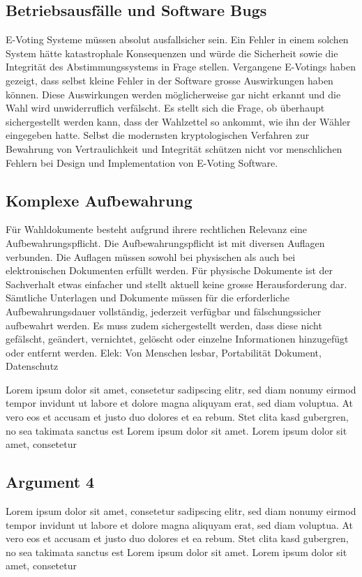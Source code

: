 \documentclass[10pt,a4paper]{article} %
\begin{document}
\begin{multicols}{2}
\subsection*{Betriebsausfälle und Software Bugs}
E-Voting Systeme müssen absolut ausfallsicher sein. Ein Fehler in einem solchen System hätte katastrophale Konsequenzen und würde die Sicherheit sowie die Integrität des Abstimmungssystems in Frage stellen.
Vergangene E-Votings haben gezeigt, dass selbst kleine Fehler in der Software grosse Auswirkungen haben können. Diese Auswirkungen werden möglicherweise gar nicht erkannt und die Wahl wird unwiderruflich verfälscht.
Es stellt sich die Frage, ob überhaupt sichergestellt werden kann, dass der Wahlzettel so ankommt, wie ihn der Wähler eingegeben hatte. Selbst die modernsten kryptologischen Verfahren zur Bewahrung von Vertraulichkeit und Integrität schützen nicht vor menschlichen Fehlern bei Design und Implementation von E-Voting Software.

 
\subsection*{Komplexe Aufbewahrung}
Für Wahldokumente besteht aufgrund ihrere rechtlichen Relevanz eine Aufbewahrungspflicht. Die Aufbewahrungspflicht ist mit diversen Auflagen verbunden. Die Auflagen müssen sowohl bei physischen als auch bei elektronischen Dokumenten erfüllt werden. Für physische Dokumente ist der Sachverhalt etwas einfacher und stellt aktuell keine grosse Herausforderung dar. Sämtliche Unterlagen und Dokumente müssen für die erforderliche Aufbewahrungsdauer vollständig, jederzeit verfügbar und fälschungssicher aufbewahrt werden. Es muss zudem sichergestellt werden, dass diese nicht gefälscht, geändert, vernichtet, gelöscht oder einzelne Informationen hinzugefügt oder entfernt werden.
Elek: Von Menschen lesbar, Portabilität Dokument, Datenschutz

Lorem ipsum dolor sit amet, consetetur sadipscing elitr, sed diam nonumy eirmod tempor invidunt ut labore et dolore magna aliquyam erat, sed diam voluptua. At vero eos et accusam et justo duo dolores et ea rebum. Stet clita kasd gubergren, no sea takimata sanctus est Lorem ipsum dolor sit amet. Lorem ipsum dolor sit amet, consetetur 
  
\subsection*{Argument 4}
Lorem ipsum dolor sit amet, consetetur sadipscing elitr, sed diam nonumy eirmod tempor invidunt ut labore et dolore magna aliquyam erat, sed diam voluptua. At vero eos et accusam et justo duo dolores et ea rebum. Stet clita kasd gubergren, no sea takimata sanctus est Lorem ipsum dolor sit amet. Lorem ipsum dolor sit amet, consetetur 


\end{multicols}
\end{document}
